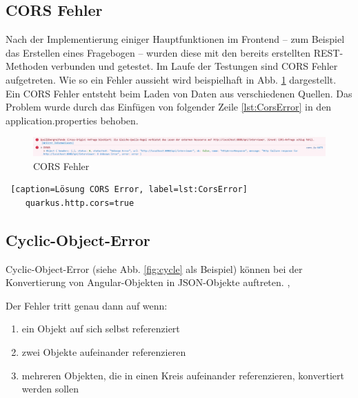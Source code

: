 \subsection{CORS Fehler}
Nach der Implementierung einiger Hauptfunktionen im Frontend -- zum Beispiel das Erstellen eines Fragebogen --
wurden diese mit den bereits erstellten REST-Methoden verbunden und getestet. Im Laufe der Testungen sind 
CORS Fehler aufgetreten. Wie so ein Fehler aussieht wird beispielhaft in Abb. \ref{fig:cors} dargestellt.
Ein CORS Fehler entsteht beim Laden von Daten aus verschiedenen Quellen. Das Problem wurde durch das Einfügen 
von folgender Zeile \ref{lst:CorsError} in den application.properties behoben.

\begin{figure}[H]
    \includegraphics[width=1\textwidth]{pics/cors_error.jpeg}
    \centering
    \caption{CORS Fehler}
    \label{fig:cors}
\end{figure}

\begin{lstlisting} [caption=Lösung CORS Error, label=lst:CorsError]
    quarkus.http.cors=true
\end{lstlisting}

\subsection{Cyclic-Object-Error}
Cyclic-Object-Error (siehe Abb. \ref{fig:cycle} als Beispiel) können bei der Konvertierung von Angular-Objekten in 
JSON-Objekte auftreten. \cite{noauthor_typeerror_nodate}, \cite{noauthor_fixing_nodate}

Der Fehler tritt genau dann auf wenn:
\begin{enumerate}
    \item ein Objekt auf sich selbst referenziert
    \item zwei Objekte aufeinander referenzieren
    \item mehreren Objekten, die in einen Kreis aufeinander referenzieren, konvertiert werden sollen
\end{enumerate}

